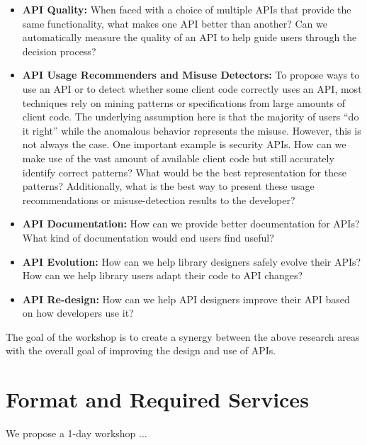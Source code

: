 \documentclass[10pt, conference]{IEEEtran}
\begin{document}
\begin{itemize}
\item \textbf{API Quality:} When faced with a choice of multiple APIs that provide the same functionality, what makes one API better than another? Can we automatically measure the quality of an API to help guide users through the decision process?

\item \textbf{API Usage Recommenders and Misuse Detectors:} To propose ways to use an API or to detect whether some client code correctly uses an API, most techniques rely on mining patterns or specifications from large amounts of client code. The underlying assumption here is that the majority of users ``do it right'' while the anomalous behavior represents the misuse. However, this is not always the case. One important example is security APIs. How can we make use of the vast amount of available client code but still accurately identify correct patterns? What would be the best representation for these patterns? Additionally, what is the best way to present these usage recommendations or misuse-detection results to the developer? 

\item\textbf{API Documentation:} How can we provide better documentation for APIs? What kind of documentation would end users find useful?

\item \textbf{API Evolution:} How can we help library designers safely evolve their APIs? How can we help library users adapt their code to API changes?

\item \textbf{API Re-design:} How can we help API designers improve their API based on how developers use it?
\end{itemize}

The goal of the workshop is to create a synergy between the above research areas with the overall goal of improving the design and use of APIs.

\section{Format and Required Services}

We propose a 1-day workshop ...
\end{document}
